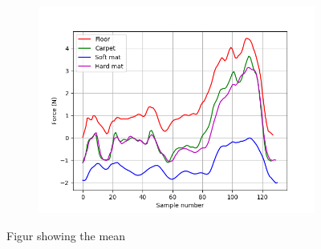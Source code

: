 \documentclass[USenglish]{ifimaster}  %
\begin{document}
\begin{figure}[h]
\begin{subfigure}{\linewidth}
		\includegraphics[scale=0.42]{Figures/meanz}
		\caption{}
		\label{fig:sub3}
	\end{subfigure}
	\caption{Figur showing the mean}
	\label{fig:meanx}
\end{figure}


\FloatBarrier
\end{document}

